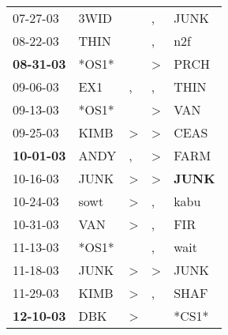 \begin{supertabular}{p{0.07\textwidth}p{0.06\textwidth}p{0.02\textwidth}p{0.02\textwidth}p{0.06\textwidth}}
          07-27-03\textsuperscript{} &           3WID\textsuperscript{} &                  &                , &           JUNK\textsuperscript{} \\
          08-22-03\textsuperscript{} &           THIN\textsuperscript{} &                  &                , &            n2f\textsuperscript{} \\
 \textbf{08-31-03\textsuperscript{}} &                            *OS1* &                  &     \textgreater &           PRCH\textsuperscript{} \\
          09-06-03\textsuperscript{} &            EX1\textsuperscript{} &                , &                , &           THIN\textsuperscript{} \\
          09-13-03\textsuperscript{} &                            *OS1* &                  &     \textgreater &            VAN\textsuperscript{} \\
          09-25-03\textsuperscript{} &           KIMB\textsuperscript{} &     \textgreater &     \textgreater &           CEAS\textsuperscript{} \\
 \textbf{10-01-03\textsuperscript{}} &           ANDY\textsuperscript{} &                , &     \textgreater &           FARM\textsuperscript{} \\
          10-16-03\textsuperscript{} &           JUNK\textsuperscript{} &     \textgreater &     \textgreater &  \textbf{JUNK\textsuperscript{}} \\
          10-24-03\textsuperscript{} &           sowt\textsuperscript{} &     \textgreater &                , &           kabu\textsuperscript{} \\
          10-31-03\textsuperscript{} &            VAN\textsuperscript{} &     \textgreater &                , &            FIR\textsuperscript{} \\
          11-13-03\textsuperscript{} &                            *OS1* &                  &                , &           wait\textsuperscript{} \\
          11-18-03\textsuperscript{} &           JUNK\textsuperscript{} &     \textgreater &     \textgreater &           JUNK\textsuperscript{} \\
          11-29-03\textsuperscript{} &           KIMB\textsuperscript{} &     \textgreater &                , &           SHAF\textsuperscript{} \\
 \textbf{12-10-03\textsuperscript{}} &            DBK\textsuperscript{} &     \textgreater &                  &                            *CS1* \\

\end{supertabular}
